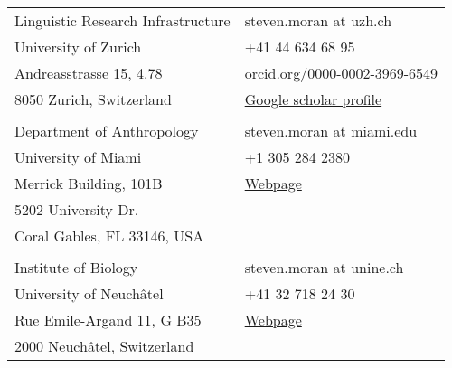 \documentclass[11pt]{article}
\begin{document}
\begin{center}
\begin{tabular}{ll}
Linguistic Research Infrastructure   & steven.moran at uzh.ch \\
University of Zurich & +41 44 634 68 95 \\ 
Andreasstrasse 15, 4.78 & \href{https://orcid.org/0000-0002-3969-6549}{orcid.org/0000-0002-3969-6549} \\
8050 Zurich, Switzerland & \href{https://scholar.google.com/citations?user=PpTOh08AAAAJ\&hl=en}{Google scholar profile} \\
\\
Department of Anthropology & steven.moran at miami.edu \\
University of Miami  & +1 305 284 2380 \\
Merrick Building, 101B &  \href{https://people.miami.edu/profile/6addca1358c4387543a61194863933df}{Webpage}\\
5202 University Dr. &  \\
Coral Gables, FL 33146, USA & \\
\\
Institute of Biology   & steven.moran at unine.ch \\
University of Neuchâtel & +41 32 718 24 30 \\
Rue Emile-Argand 11, G B35 & \href{https://www.unine.ch/sciences/biographie/steven-moran}{Webpage} \\
2000 Neuchâtel, Switzerland & \\
\end{tabular}
\end{center}
\end{document}
